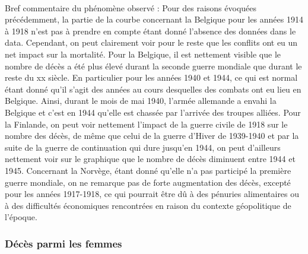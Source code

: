 \documentclass{article}
\begin{document}
\paragraph{}
Bref commentaire du phénomène observé : 
Pour des raisons évoquées précédemment, la partie de la courbe concernant la Belgique pour les années 1914 à 1918 n'est pas à prendre en compte étant donné l'absence des données dans le data. Cependant, on peut clairement voir pour le reste que les conflits ont eu un net impact sur la mortalité. Pour la Belgique, il est nettement visible que le nombre de décès a été plus élevé durant la seconde guerre mondiale que durant le reste du xx siècle. En particulier pour les années 1940 et 1944, ce qui est normal étant donné qu'il s'agit des années au cours desquelles des combats ont eu lieu en Belgique. Ainsi, durant le mois de mai 1940, l'armée allemande a envahi la Belgique et c'est en 1944 qu'elle est chassée par l'arrivée des troupes alliées. Pour la Finlande, on peut voir nettement l'impact de la guerre civile de 1918 sur le nombre des décès, de même que celui de la guerre d'Hiver de 1939-1940 et par la suite de la guerre de continuation qui dure jusqu'en 1944, on peut d'ailleurs nettement voir sur le graphique que le nombre de décès diminuent entre 1944 et 1945. Concernant la Norvège, étant donné qu'elle n'a pas participé la première guerre mondiale, on ne remarque pas de forte augmentation des décès, excepté pour les années 1917-1918, ce qui pourrait être dû à des pénuries alimentaires ou à des difficultés économiques rencontrées en raison du contexte géopolitique de l'époque. 
\subsubsection{Décès parmi les femmes}
\paragraph{}



\end{document}
